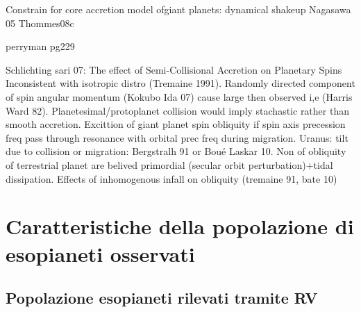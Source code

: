 \begin{workout}

\end{workout}

\begin{workout}
Constrain for core accretion model ofgiant planets: dynamical shakeup Nagasawa 05 Thommes08c
\end{workout}

\begin{workout}
perryman pg229
\end{workout}


\begin{workout}

\end{workout}

\begin{workout}
Schlichting sari 07: The effect of Semi-Collisional Accretion on Planetary Spins
Inconsistent with isotropic distro (Tremaine 1991). Randomly directed component of spin angular momentum (Kokubo Ida 07) cause large then observed i,e (Harris Ward 82).
Planetesimal/protoplanet collision would imply stachastic rather than smooth accretion.
Excittion of giant planet spin obliquity if spin axis precession freq pass through resonance with orbital prec freq during migration.
Uranus: tilt due to collision or migration: Bergstralh 91 or Bou\'e Laskar 10.
Non of obliquity of terrestrial planet are belived primordial (secular orbit perturbation)+tidal dissipation.
Effects of inhomogenous infall on obliquity (tremaine 91, bate 10)
\end{workout}


{\let\clearpage\relax\let\cleardoublepage\relax
\chapter{Caratteristiche della popolazione di esopianeti osservati}
}

\vspace{5cm}

\section{Popolazione esopianeti rilevati tramite RV}

